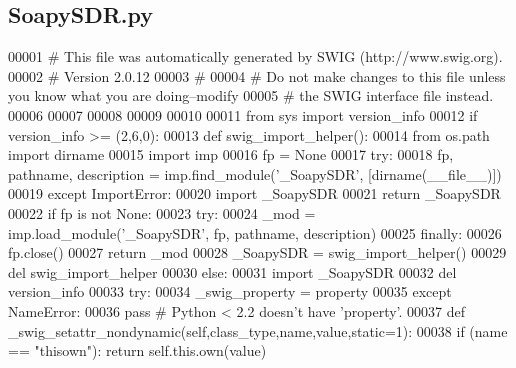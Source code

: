 \subsection{Soapy\+S\+D\+R.\+py}
\label{SoapySDR_8py_source}

\begin{DoxyCode}
00001 \textcolor{comment}{# This file was automatically generated by SWIG (http://www.swig.org).}
00002 \textcolor{comment}{# Version 2.0.12}
00003 \textcolor{comment}{#}
00004 \textcolor{comment}{# Do not make changes to this file unless you know what you are doing--modify}
00005 \textcolor{comment}{# the SWIG interface file instead.}
00006 
00007 
00008 
00009 
00010 
00011 \textcolor{keyword}{from} sys \textcolor{keyword}{import} version\_info
00012 \textcolor{keywordflow}{if} version\_info >= (2,6,0):
00013     \textcolor{keyword}{def }swig_import_helper():
00014         \textcolor{keyword}{from} os.path \textcolor{keyword}{import} dirname
00015         \textcolor{keyword}{import} imp
00016         fp = \textcolor{keywordtype}{None}
00017         \textcolor{keywordflow}{try}:
00018             fp, pathname, description = imp.find\_module(\textcolor{stringliteral}{'\_SoapySDR'}, [dirname(\_\_file\_\_)])
00019         \textcolor{keywordflow}{except} ImportError:
00020             \textcolor{keyword}{import} \_SoapySDR
00021             \textcolor{keywordflow}{return} \_SoapySDR
00022         \textcolor{keywordflow}{if} fp \textcolor{keywordflow}{is} \textcolor{keywordflow}{not} \textcolor{keywordtype}{None}:
00023             \textcolor{keywordflow}{try}:
00024                 \_mod = imp.load\_module(\textcolor{stringliteral}{'\_SoapySDR'}, fp, pathname, description)
00025             \textcolor{keywordflow}{finally}:
00026                 fp.close()
00027             \textcolor{keywordflow}{return} \_mod
00028     \_SoapySDR = swig_import_helper()
00029     del swig\_import\_helper
00030 \textcolor{keywordflow}{else}:
00031     \textcolor{keyword}{import} \_SoapySDR
00032 del version\_info
00033 \textcolor{keywordflow}{try}:
00034     \_swig\_property = property
00035 \textcolor{keywordflow}{except} NameError:
00036     \textcolor{keywordflow}{pass} \textcolor{comment}{# Python < 2.2 doesn't have 'property'.}
00037 \textcolor{keyword}{def }_swig_setattr_nondynamic(self,class\_type,name,value,static=1):
00038     \textcolor{keywordflow}{if} (name == \textcolor{stringliteral}{"thisown"}): \textcolor{keywordflow}{return} self.this.own(value)

\end{DoxyCode}
